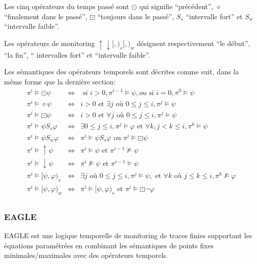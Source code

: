 Les cinq opérateurs du temps passé sont $\odot$ qui signifie ``précédent'', $\diamond$ ``finalement dans le passé'', $\boxdot$ ``toujours dans le passé'', $\mathrel{S_s}$ ``intervalle fort'' et $\mathrel{S_w}$ ``intervalle faible''.

Les opérateurs de monitoring $\uparrow \downarrow [,)_s [,)_w$ désignent respectivement ``le début'', ``la fin'', `` intervalles fort'' et ``intervalle faible''.

Les sémantiques des opérateurs temporels sont décrites comme suit, dans la même forme que la dernière section:
\begin{eqnarray*}
\pi^i \vDash \odot \psi & \iff & \mbox{ si } i > 0, \pi^{i - 1} \vDash \psi, ou \mbox{ si } i = 0, \pi^0 \vDash \psi \\
\pi^i \vDash \diamond \psi & \iff & i > 0 \mbox{ et } \exists j \mbox{ où } 0 \leq j \leq i, \pi^j \vDash \psi \\
\pi^i \vDash \boxdot \psi & \iff & i > 0 \mbox{ et } \forall j \mbox{ où } 0 \leq j \leq i, \pi^j \vDash \psi \\
\pi^i \vDash \psi \mathrel{S_s} \varphi & \iff & \exists 0 \leq j \leq i, \pi^j \vDash \varphi \mbox{ et } \forall k, j < k \leq i, \pi^k \vDash \psi \\
\pi^i \vDash \psi \mathrel{S_w} \varphi & \iff & \pi^i \vDash \psi \mathrel{S_s} \varphi \mbox{ ou } \pi^i \vDash \boxdot\psi \\
\pi^i \vDash \uparrow \psi & \iff & \pi^i \vDash \psi \mbox{ et } \pi^{i - 1} \nvDash \psi \\
\pi^i \vDash \downarrow \psi & \iff & \pi^i \nvDash \psi \mbox{ et } \pi^{i - 1} \vDash \psi \\
\pi^i \vDash [\psi, \varphi)_s & \iff & \exists j \mbox{ où } 0 \leq j \leq i, \pi^j \vDash \psi, \mbox{ et } \forall k \mbox{ où } j \leq k \leq i, \pi^k \nvDash \varphi \\
\pi^i \vDash [\psi, \varphi)_w & \iff & \pi^i \vDash [\psi, \varphi)_s \mbox{ et } \pi^i \vDash \boxdot\neg\varphi \\
\end{eqnarray*}

\subsubsection{EAGLE}

EAGLE \citep{barringer2004rule} est une logique temporelle de monitoring de traces finies supportant les équations paramétrées en combinant les sémantiques de points fixes minimales/maximales avec des opérateurs temporels.

